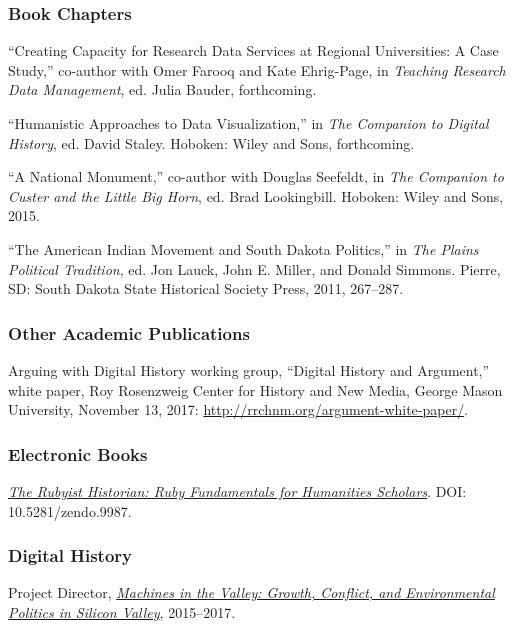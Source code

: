 \subsubsection{Book Chapters}\label{book-chapters}

``Creating Capacity for Research Data Services at Regional Universities:
A Case Study,'' co-author with Omer Farooq and Kate Ehrig-Page, in
\emph{Teaching Research Data Management}, ed. Julia Bauder, forthcoming.

``Humanistic Approaches to Data Visualization,'' in \emph{The Companion
to Digital History}, ed. David Staley. Hoboken: Wiley and Sons,
forthcoming.

``A National Monument,'' co-author with Douglas Seefeldt, in \emph{The
Companion to Custer and the Little Big Horn}, ed. Brad Lookingbill.
Hoboken: Wiley and Sons, 2015.

``The American Indian Movement and South Dakota Politics,'' in \emph{The
Plains Political Tradition}, ed. Jon Lauck, John E. Miller, and Donald
Simmons. Pierre, SD: South Dakota State Historical Society Press, 2011,
267--287.

\subsubsection{Other Academic
Publications}\label{other-academic-publications}

Arguing with Digital History working group, ``Digital History and
Argument,'' white paper, Roy Rosenzweig Center for History and New
Media, George Mason University, November 13, 2017:
\url{http://rrchnm.org/argument-white-paper/}.

\subsubsection{Electronic Books}\label{electronic-books}

\emph{\href{http://hepplerj.github.io/rubyist-historian/}{The Rubyist
Historian: Ruby Fundamentals for Humanities Scholars}}. DOI:
10.5281/zendo.9987.

\subsubsection{Digital History}\label{digital-history}

Project Director,
\emph{\href{http://dissertation.jasonheppler.org}{Machines in the
Valley: Growth, Conflict, and Environmental Politics in Silicon
Valley}}, 2015--2017.

